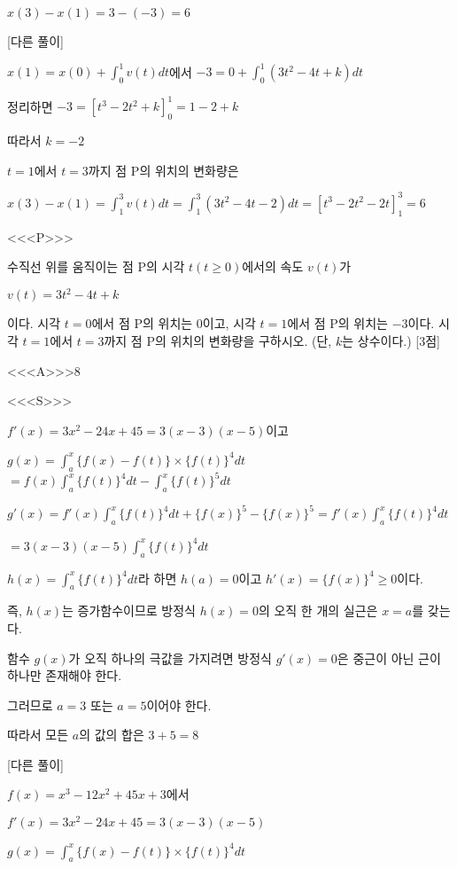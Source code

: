 \documentclass{oblivoir}
\begin{document}
$x(3)-x(1)=3-(-3)=6$

[다른 풀이]

$x(1)=x(0)+\displaystyle\int_{0}^{1}v(t)dt$에서 $-3=0+\displaystyle\int_{0}^{1}(3t^{2}-4t+k)dt$

정리하면 $-3=\left[t^{3}-2t^{2}+k\right]_{0}^{1}=1-2+k$

따라서 $k=-2$

$t=1$에서 $t=3$까지 점 $\mathrm{P}$의 위치의 변화량은

$x(3)-x(1)=\displaystyle\int_{1}^{3}v(t)dt=\displaystyle\int_{1}^{3}(3t^{2}-4t-2)dt=\left[t^{3}-2t^{2}-2t\right]_{1}^{3}=6$

<<<P>>>

수직선 위를 움직이는 점 $\mathrm{P}$의 시각 $t(t\ge 0)$에서의 속도 $v(t)$가

$v(t)=3t^{2}-4t+k$

이다. 시각 $t=0$에서 점 $\mathrm{P}$의 위치는 $0$이고, 시각 $t=1$에서 점 $\mathrm{P}$의 위치는 $-3$이다. 시각 $t=1$에서 $t=3$까지 점 $\mathrm{P}$의 위치의 변화량을 구하시오. (단, $k$는 상수이다.) [3점]

<<<A>>>$8$

<<<S>>>

$f'(x)$$=3x^{2}-24x+45$$=3(x-3)(x-5)$이고

$g(x)$$=\displaystyle\int_{a}^{x}\{f(x)-f(t)\}\times\{f(t)\}^{4}dt$$=f(x)\displaystyle\int_{a}^{x}\{f(t)\}^{4}dt -\displaystyle\int_{a}^{x}\{f(t)\}^{5}dt$

$g'(x)$$=f'(x)\displaystyle\int_{a}^{x}\{f(t)\}^{4}dt +\{f(x)\}^{5}-\{f(x)\}^{5}$$=f'(x)\displaystyle\int_{a}^{x}\{f(t)\}^{4}dt$

$=3(x-3)(x-5)\displaystyle\int_{a}^{x}\{f(t)\}^{4}dt$

$h(x)=\displaystyle\int_{a}^{x}\{f(t)\}^{4}dt$라 하면 $h(a)=0$이고 $h'(x)=\{f(x)\}^{4}\ge 0$이다.

즉, $h(x)$는 증가함수이므로 방정식 $h(x)=0$의 오직 한 개의 실근은 $x=a$를 갖는다.

함수 $g(x)$가 오직 하나의 극값을 가지려면 방정식 $g'(x)=0$은 중근이 아닌 근이 하나만 존재해야 한다.

그러므로 $a=3$ 또는 $a=5$이어야 한다.

따라서 모든 $a$의 값의 합은 $3+5 =8$

[다른 풀이]

$f(x)=x^{3}-12x^{2}+45x+3$에서

$f'(x)$$=3x^{2}-24x+45$$=3(x-3)(x-5)$

$g(x)$$=\displaystyle\int_{a}^{x}\{f(x)-f(t)\}\times\{f(t)\}^{4}dt$
\end{document}
